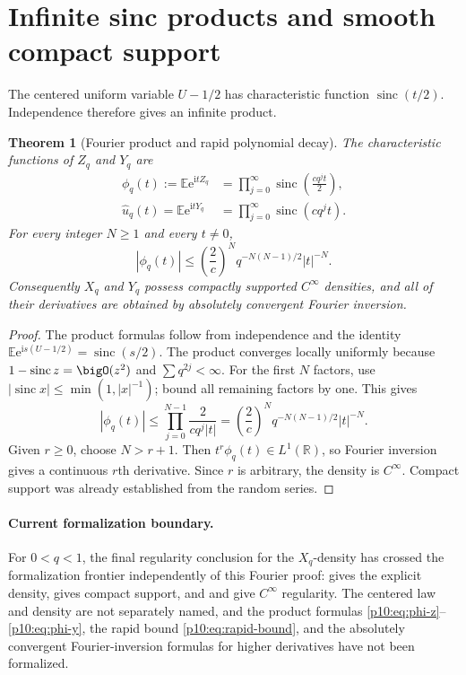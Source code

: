 \documentclass[11pt]{article}
\numberwithin{equation}{section}
\newtheorem{theorem}{Theorem}[section]
\theoremstyle{definition}
\theoremstyle{remark}
\newcommand{\R}{\mathbb R}
\newcommand{\E}{\mathbb E}
\newcommand{\sinc}{\operatorname{sinc}}
\newcommand{\e}{\mathrm e}
\newcommand{\ii}{\mathrm i}
\begin{document}
\section{Infinite sinc products and smooth compact support}
\label{p10:sec:fourier}

The centered uniform variable $U-1/2$ has characteristic function
$\sinc(t/2)$.  Independence therefore gives an infinite product.

\begin{theorem}[Fourier product and rapid polynomial decay]
\label{p10:thm:smoothness}
The characteristic functions of $Z_q$ and $Y_q$ are
\begin{align}
 \phi_q(t):=\E\e^{\ii tZ_q}
 &=\prod_{j=0}^{\infty}\sinc\!\left(\frac{cq^jt}{2}\right),  \label{p10:eq:phi-z}\\
 \widehat u_q(t)=\E\e^{\ii tY_q}
 &=\prod_{j=0}^{\infty}\sinc(cq^jt).                         \label{p10:eq:phi-y}
\end{align}
For every integer $N\ge1$ and every $t\ne0$,
\begin{equation}
 |\phi_q(t)|
 \le \left(\frac{2}{c}\right)^N q^{-N(N-1)/2}|t|^{-N}.      \label{p10:eq:rapid-bound}
\end{equation}
Consequently $X_q$ and $Y_q$ possess compactly supported $C^\infty$ densities, and all
of their derivatives are obtained by absolutely convergent Fourier inversion.
\end{theorem}

\begin{proof}
The product formulas follow from independence and the identity
\(
 \E\e^{\ii s(U-1/2)}=\sinc(s/2).
\)
The product converges locally uniformly because
$1-\sinc z=\bigO(z^2)$ and $\sum q^{2j}<\infty$.
For the first $N$ factors, use $|\sinc x|\le\min(1,|x|^{-1})$; bound all remaining factors by
one.  This gives
\[
 |\phi_q(t)|
 \le\prod_{j=0}^{N-1}\frac{2}{cq^j|t|}
 =\left(\frac{2}{c}\right)^Nq^{-N(N-1)/2}|t|^{-N}.
\]
Given $r\ge0$, choose $N>r+1$.  Then $t^r\phi_q(t)\in L^1(\R)$, so Fourier inversion gives a
continuous $r$th derivative.  Since $r$ is arbitrary, the density is $C^\infty$.  Compact
support was already established from the random series.
\end{proof}

\paragraph{Current formalization boundary.}
For \(0<q<1\), the final regularity conclusion for the \(X_q\)-density has crossed the
formalization frontier independently of this Fourier proof:
 gives the explicit density,
 gives compact support, and
 and
 give \(C^\infty\) regularity.  The centered law and
density are not separately named, and the product formulas
\eqref{p10:eq:phi-z}--\eqref{p10:eq:phi-y}, the rapid bound
\eqref{p10:eq:rapid-bound}, and the absolutely convergent Fourier-inversion formulas for
higher derivatives have not been formalized.
\end{document}
